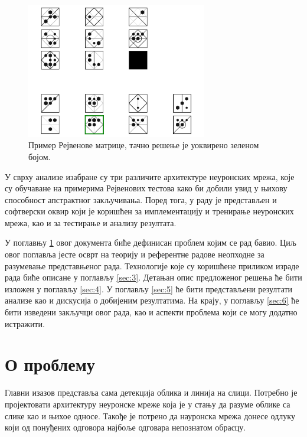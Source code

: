 \documentclass[a4paper, 12pt, master, utf8]{etf}
\begin{document}
\begin{figure}[h]
    \centering
    \includegraphics[width=0.7\textwidth]{images/output.png}
    \caption{Пример Рејвенове матрице, тачно решење је уоквирено зеленом бојом.}
    \label{fig:raven_example}
\end{figure}

У сврху анализе изабране су три различите архитектуре неуронских мрежа, које су обучаване на примерима Рејвенових тестова како би добили увид у њихову способност апстрактног закључивања.
Поред тога, у раду је представљен и софтверски оквир који је коришћен за имплементацију и тренирање неуронских мрежа, као и за тестирање и анализу резултата. 
\newline

У поглавњу \ref{sec:2} овог документа биће дефинисан проблем којим се рад бавио. Циљ овог поглавља јесте осврт на теорију и референтне радове неопходне за разумевање представњеног рада. Технологије које су коришћене
приликом израде рада биће описане у поглављу \ref{sec:3}. Детањан опис предложеног решења ће бити изложен у поглављу \ref{sec:4}. У поглављу \ref{sec:5} ће бити представљени резултати анализе као и дискусија о добијеним резултатима. 
На крају, у поглављу \ref{sec:6} ће бити изведени закључци овог рада, као и аспекти проблема који се могу додатно истражити.

\chapter{О проблему}
\label{sec:2}

Главни изазов представља сама детекција облика и линија на слици. Потребно је пројектовати архитектуру неуронске мреже која је у стању да разуме облике
са слике као и њихое односе. Такође је потрено да науронска мрежа донесе одлуку који од понуђених одговора најбоље одговара непознатом обрасцу.
\newline
\end{document}
